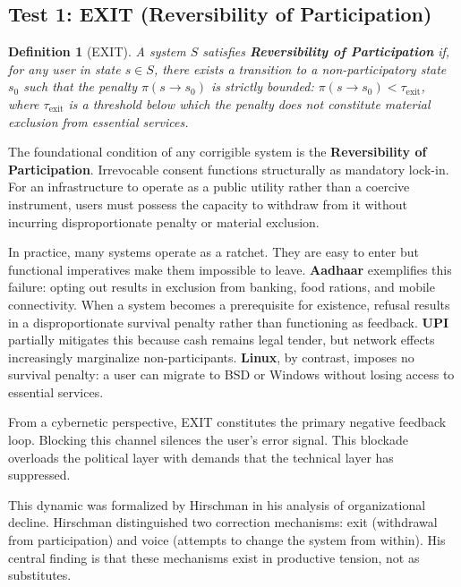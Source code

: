 \documentclass{article}
\newtheorem{definition}{Definition}
\begin{document}
\subsection{Test 1: EXIT (Reversibility of Participation)}

\begin{definition}[EXIT]
\label{def:exit}
A system $S$ satisfies \textbf{Reversibility of Participation} if, for any user in state $s \in S$, there exists a transition to a non-participatory state $s_0$ such that the penalty $\pi(s \to s_0)$ is strictly bounded: $\pi(s \to s_0) < \tau_{\text{exit}}$, where $\tau_{\text{exit}}$ is a threshold below which the penalty does not constitute material exclusion from essential services.
\end{definition}

The foundational condition of any corrigible system is the \textbf{Reversibility of Participation}. Irrevocable consent functions structurally as mandatory lock-in. For an infrastructure to operate as a public utility rather than a coercive instrument, users must possess the capacity to withdraw from it without incurring disproportionate penalty or material exclusion.

In practice, many systems operate as a ratchet. They are easy to enter but functional imperatives make them impossible to leave. \textbf{Aadhaar} exemplifies this failure: opting out results in exclusion from banking, food rations, and mobile connectivity. When a system becomes a prerequisite for existence, refusal results in a disproportionate survival penalty rather than functioning as feedback. \textbf{UPI} partially mitigates this because cash remains legal tender, but network effects increasingly marginalize non-participants. \textbf{Linux}, by contrast, imposes no survival penalty: a user can migrate to BSD or Windows without losing access to essential services.

From a cybernetic perspective, EXIT constitutes the primary negative feedback loop. Blocking this channel silences the user's error signal. This blockade overloads the political layer with demands that the technical layer has suppressed.

This dynamic was formalized by Hirschman \citep{hirschman1970} in his analysis of organizational decline. Hirschman distinguished two correction mechanisms: exit (withdrawal from participation) and voice (attempts to change the system from within). His central finding is that these mechanisms exist in productive tension, not as substitutes.
\end{document}
